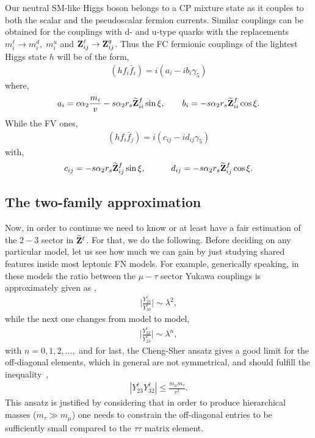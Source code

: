 \documentclass[aps,prd,groupaddress,floatfix,tighten,nofootinbib,showpacs,
amsfonts,superscriptaddress]{revtex4}
\begin{document}
Our neutral SM-like Higgs boson belongs to a CP mixture state as it
couples to both the scalar and the pseudoscalar fermion currents. {  Similar couplings can be obtained for the couplings with d- and u-type quarks with the replacements $m_i^\ell \rightarrow m_i^d, \; m_i^u$ and ${\bf Z}_{ij}^\ell \rightarrow {\bf Z}_{ij}^q$. Thus the FC fermionic couplings of the lightest Higgs state $h$ will be of the form,} 
%	
{  
	\begin{eqnarray}
		( h f_i \bar{f}_i ) = i( a_i - ib_i \gamma_5)
	\end{eqnarray}
	where,
	\begin{eqnarray}
		a_i = c\alpha_2 \frac{m_i}{v} - s\alpha_2 r_s \widetilde{\bf Z}_{ii}^f \sin \xi ,\quad \quad
		b_i = -s\alpha_2 r_s \widetilde{\bf Z}_{ii}^f \cos \xi .
	\end{eqnarray}
	While the FV ones,
	\begin{eqnarray}
		( h f_i \bar{f}_j ) = i( c_{ij} - i d_{ij} \gamma_5)
	\end{eqnarray}
	with,
	\begin{eqnarray}
		c_{ij} = -	 s\alpha_2 r_s \widetilde{\bf Z}_{ij}^f \sin \xi , \quad\quad \quad
		d_{ij} = - s\alpha_2 r_s \widetilde{\bf Z}_{ij}^f \cos \xi .
	\end{eqnarray}
}
%	

\subsection{The two-family approximation\label{subsec:subsec:twofamilyap}}
Now, in order to continue we need to know or at least have a fair estimation of
the $2-3$ sector in $\widetilde{\bf Z}^\ell$. 
For that, we do the following. Before deciding on any particular
model, let us see how much we can gain by just studying shared features inside most
leptonic FN models. For example, 
generically speaking, in these models the ratio between the $\mu-\tau$ sector Yukawa couplings is approximately given as \cite{Chen:2011sb,Dery:2014kxa,Huitu:2016pwk},
\begin{eqnarray}
	\Bigg| \frac{Y_{23}^\ell}{Y_{33}^\ell } \Bigg| \sim \lambda^2, 
\end{eqnarray} 
while the next one changes from model to model,
\begin{eqnarray}
	\Bigg| \frac{Y_{22}^\ell}{Y_{23}^\ell } \Bigg| \sim \lambda^{n},
\end{eqnarray}
with $n= 0,1,2,\dots,$ and for last, the Cheng-Sher ansatz gives a good limit for the off-diagonal elements, 
which in general are not symmetrical, and should fulfill the inequality~\cite{Cheng:1987rs},
\begin{eqnarray}
	| {Y_{23}^\ell}{Y_{32}^\ell } | \leq \frac{m_\mu m_\tau}{v^2}.
\end{eqnarray}
{This ansatz is justified by considering that in order to produce hierarchical masses ($m_\tau \gg m_\mu$) one needs to constrain the off-diagonal entries to be sufficiently small compared to the $\tau \tau$ matrix element.}
\end{document}
